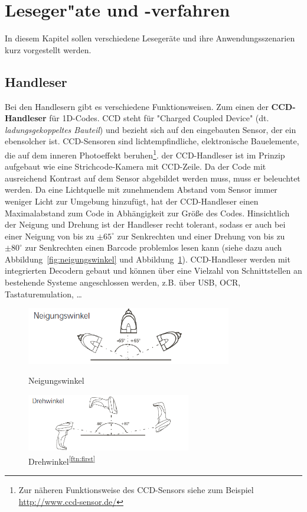 \section{Leseger"ate und -verfahren}\label{chap:reader}
In diesem Kapitel sollen verschiedene Lesegeräte und ihre Anwendungsszenarien kurz vorgestellt werden.

\subsection{Handleser}
Bei den Handlesern gibt es verschiedene Funktionsweisen. Zum einen der \textbf{CCD-Handleser} für 1D-Codes. CCD steht für "Charged Coupled Device" (dt. \textit{ladungsgekoppeltes Bauteil}) und bezieht sich auf den eingebauten Sensor, der ein ebensolcher ist. CCD-Sensoren sind lichtempfindliche, elektronische Bauelemente, die auf dem inneren Photoeffekt beruhen\footnote{Zur näheren Funktionsweise des CCD-Sensors siehe zum Beispiel \url{http://www.ccd-sensor.de/}}. der CCD-Handleser ist im Prinzip aufgebaut wie eine Strichcode-Kamera mit CCD-Zeile. Da der Code mit ausreichend Kontrast auf dem Sensor abgebildet werden muss, muss er beleuchtet werden. Da eine Lichtquelle mit zunehmendem Abstand vom Sensor immer weniger Licht zur Umgebung hinzufügt, hat der CCD-Handleser einen Maximalabstand zum Code in Abhängigkeit zur Größe des Codes. Hinsichtlich der Neigung und Drehung ist der Handleser recht tolerant, sodass er auch bei einer Neigung von bis zu $\pm65^\circ$ zur Senkrechten und einer Drehung von bis zu $\pm80^\circ$ zur Senkrechten einen Barcode problemlos lesen kann (siehe dazu auch Abbildung~\ref{fig:neigungswinkel} und Abbildung~\ref{fig:drehwinkel}). CCD-Handleser werden mit integrierten Decodern gebaut und können über eine Vielzahl von Schnittstellen an bestehende Systeme angeschlossen werden, z.B. über USB, OCR, Tastaturemulation, \dots \\

\begin{figure}[htbp]
	\parbox{.47\textwidth}
	{
		\centering
		\includegraphics[height=2.5cm]{Bilder/Neigungswinkel.png}
		\caption[Neigungswinkel]{Neigungswinkel\footnotemark}
		\label{fig:neigungswinkel}
	}
	\hfill
	\parbox{.47\textwidth}
	{
		\centering
		\includegraphics[height=2.5cm]{Bilder/Drehwinkel.png}
		\caption[Drehwinkel]{Drehwinkel\textsuperscript{\ref{ftn:first}}}
		\label{fig:drehwinkel}
	}
	\hfill
\end{figure}


